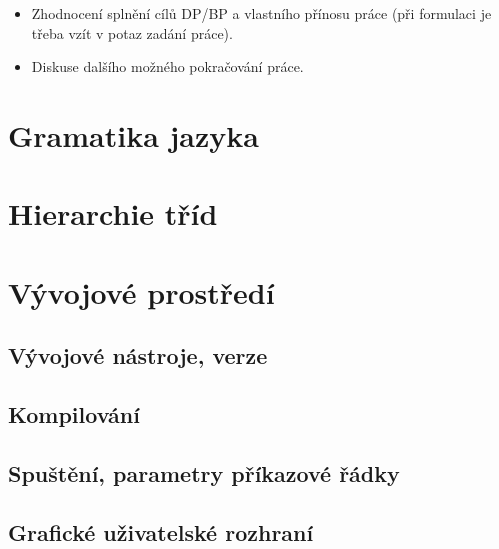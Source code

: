 \documentclass[11pt,twoside,a4paper]{book}
\begin{document}
\begin{itemize}
\item Zhodnocení splnění cílů DP/BP a  vlastního přínosu práce (při formulaci je třeba vzít v potaz zadání práce).
\item Diskuse dalšího možného pokračování práce.
\end{itemize}



%
%
%



\appendix


\chapter{Gramatika jazyka}



\chapter{Hierarchie tříd}



\chapter{Vývojové prostředí}

\section{Vývojové nástroje, verze}
\section{Kompilování}
\section{Spuštění, parametry příkazové řádky}
\section{Grafické uživatelské rozhraní}
\end{document}

